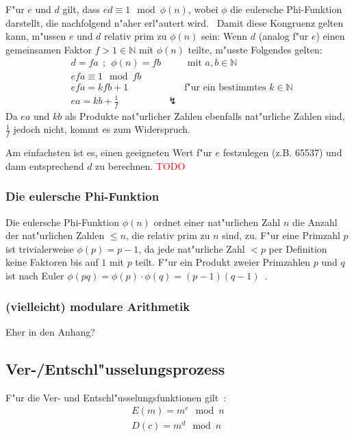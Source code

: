 \documentclass[12pt]{article}
\newcommand{\todo}[1]{\textcolor{red}{\mbox{TODO}}\marginpar{\textcolor{red}{#1}}}
\begin{document}
F"ur $e$ und $d$ gilt, dass $ed \equiv 1 \mod \phi(n)$,
wobei $\phi$ die eulersche Phi-Funktion darstellt, die nachfolgend n"aher erl"autert wird.~\cite{rsa}
Damit diese Kongruenz gelten kann, m"ussen $e$ und $d$ relativ prim zu $\phi(n)$ sein:
Wenn $d$ (analog f"ur $e$) einen gemeinsamen Faktor $f > 1 \in \mathbb{N}$ mit $\phi(n)$ teilte, m"usste Folgendes gelten:
\[
\begin{aligned}
&d = fa ~~;~~ \phi(n) = fb && \textrm{ mit } a, b \in \mathbb{N} \\
&efa \equiv 1 \mod fb \\
&efa = kfb + 1 && \textrm{f"ur ein bestimmtes } k \in \mathbb{N} \\
&ea = kb + \frac{1}{f} & \lightning &
\end{aligned}
\]
Da $ea$ und $kb$ als Produkte nat"urlicher Zahlen ebenfalls nat"urliche Zahlen sind, $\frac{1}{f}$ jedoch nicht, kommt es zum Widerspruch.

Am einfachsten ist es, einen geeigneten Wert f"ur $e$ festzulegen (z.B. 65537)
und dann entsprechend $d$ zu berechnen.
\todo{Wie kann man das berechnen?}

\subsubsection{Die eulersche Phi-Funktion}
Die eulersche Phi-Funktion $\phi(n)$ ordnet einer nat"urlichen Zahl $n$ die Anzahl der nat"urlichen Zahlen $\leq n$,
die relativ prim zu $n$ sind, zu.
F"ur eine Primzahl $p$ ist trivialerweise $\phi(p) = p-1$,
da jede nat"urliche Zahl $<p$ per Definition keine Faktoren bis auf $1$ mit $p$ teilt.
F"ur ein Produkt zweier Primzahlen $p$ und $q$ ist nach Euler
$\phi(pq) = \phi(p) \cdot \phi(q) = (p-1)(q-1)$~\cite{euler63}.

\subsubsection{(vielleicht) modulare Arithmetik}
Eher in den Anhang?
\subsection{Ver-/Entschl"usselungsprozess}
F"ur die Ver- und Entschl"usselungsfunktionen gilt~\cite{rsa}:
\[
\begin{aligned}
E(m) = m^e \mod n \\
D(c) = m^d \mod n
\end{aligned}
\]
\end{document}
